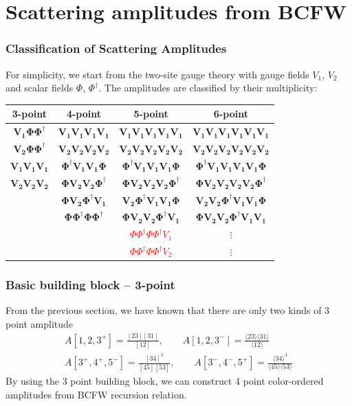 \documentclass{beamer}
\newcommand{\avg}[1]{\langle #1 \rangle}
\begin{document}
\section{Scattering amplitudes from BCFW}
\begin{frame}
    \frametitle{Classification of Scattering Amplitudes}
    \centering
    For simplicity, we start from the two-site gauge theory with gauge fields $V_1$, $V_2$ and scalar fields $\Phi$, $\Phi^\dagger$. The amplitudes are classified by their multiplicity:
    
    \vspace{1em}

    \renewcommand{\arraystretch}{1.3}
    \setlength{\tabcolsep}{6pt}
    \begin{tabular}{|c|c|c|c|}
        \hline
        \textbf{3-point} & \textbf{4-point} & \textbf{5-point} & \textbf{6-point} \\
        \hline
        $\bm{V_1\Phi\Phi^\dagger}$ & $\bm{V_1V_1V_1V_1}$ & $\bm{V_1V_1V_1V_1V_1}$ & $\bm{V_1V_1V_1V_1V_1V_1}$ \\
        $\bm{V_2\Phi\Phi^\dagger}$ & $\bm{V_2V_2V_2V_2}$ & $\bm{V_2V_2V_2V_2V_2}$ & $\bm{V_2V_2V_2V_2V_2V_2}$ \\
        $\bm{V_1V_1V_1}$ & $\bm{\Phi^\dagger V_1V_1\Phi}$ & $\bm{\Phi^\dagger V_1V_1V_1\Phi}$ & $\bm{\Phi^\dagger V_1V_1V_1V_1\Phi}$ \\
        $\bm{V_2V_2V_2}$ & $\bm{\Phi V_2V_2\Phi^\dagger}$ & $\bm{\Phi V_2V_2V_2\Phi^\dagger}$ & $\bm{\Phi V_2V_2V_2V_2\Phi^\dagger}$ \\
        & $\bm{\Phi V_2 \Phi^\dagger V_1}$ & $\bm{V_2\Phi^\dagger V_1V_1\Phi}$ & $\bm{V_2V_2\Phi^\dagger V_1V_1\Phi}$ \\
        & $\bm{\Phi\Phi^\dagger\Phi\Phi^\dagger}$ & $\bm{\Phi V_2V_2\Phi^\dagger V_1}$ & $\bm{\Phi V_2V_2\Phi^\dagger V_1V_1}$ \\
        & & \textcolor{red}{$\Phi\Phi^\dagger\Phi\Phi^\dagger V_1$} & $\vdots$ \\
        & & \textcolor{red}{$\Phi\Phi^\dagger\Phi\Phi^\dagger V_2$} & $\vdots$ \\
        \hline
    \end{tabular}
\end{frame}
\begin{frame}
    \frametitle{Basic building block -- 3-point}
    From the previous section, we have known that there are only two kinds of 3 point amplitude
    \begin{gather*}
        A[1,2,3^+]=\frac{[23][31]}{[12]},\qquad A[1,2,3^-]=\frac{\avg{23}\!\avg{31}}{\avg{12}}\\
        A[3^+,4^+,5^-]=\frac{[34]^3}{[45][53]},\qquad A[3^-,4^-,5^+]=\frac{\avg{34}^3}{\avg{45}\!\avg{53}}
    \end{gather*}
    By using the 3 point building block, we can construct 4 point color-ordered amplitudes from BCFW recursion relation.
\end{frame}
\end{document}

